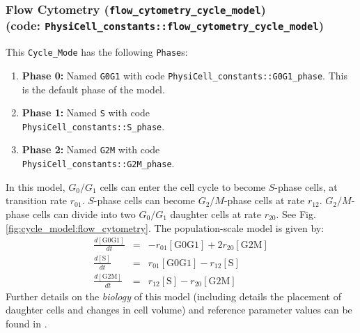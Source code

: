 \documentclass[12pt]{article}
\newcommand{\beqa}{\begin{eqnarray}}
\newcommand{\eeqa}{\end{eqnarray}}
\renewcommand{\v}{\verb}
\renewcommand{\t}[1]{\left[\mathrm{#1}\right]}
\begin{document}
\subsubsection{Flow Cytometry (\texttt{flow\_cytometry\_cycle\_model})\\
(code: \texttt{PhysiCell\_constants::flow\_cytometry\_cycle\_model})}
\label{sec:Standard_Models:Flow_Cytometry}
This \v|Cycle_Mode| has the following \v|Phase|s: 
\begin{enumerate}
\item 
\textbf{Phase 0:} Named \v|G0G1| with code \v|PhysiCell_constants::G0G1_phase|. This is the default 
phase of the model. 

\item 
\textbf{Phase 1:} Named \v|S| with code \\ \v|PhysiCell_constants::S_phase|. 

\item 
\textbf{Phase 2:} Named \v|G2M| with code \\ \v|PhysiCell_constants::G2M_phase|. 

\end{enumerate}

In this model, $G_0/G_1$ cells can enter the cell cycle to 
become $S$-phase cells, at transition rate $r_{01}$. $S$-phase cells 
can become $G_2/M$-phase cells at rate $r_{12}$. 
$G_2/M$-phase cells can divide into two $G_0/G_1$ daughter cells 
at rate $r_{20}$. 
See Fig. \ref{fig:cycle_model:flow_cytometry}. The 
population-scale model is given by: 
\beqa
\frac{d\t{G0G1}}{dt} & = & -r_{01} \t{G0G1} + 2 r_{20} \t{G2M} \\
\frac{d\t{S}}{dt} & = &  r_{01} \t{G0G1} -r_{12} \t{S} \\
\frac{d\t{G2M}}{dt} & = &  r_{12} \t{S} -r_{20} \t{G2M} 
\eeqa
Further details on the \emph{biology} of this model (including 
details the placement of daughter cells and changes in cell 
volume) and reference parameter values can be found in \cite{ref:PhysiCell}. 
\end{document}
